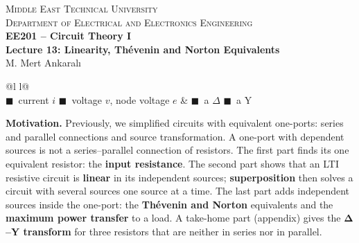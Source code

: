\documentclass[11pt,a4paper]{article}
\newcommand{\Icol}[1]{\textcolor{ccur}{#1}}
\newcommand{\Vcol}[1]{\textcolor{cvolt}{#1}}
\begin{document}
\begin{center}
\begin{tcolorbox}[enhanced, colback=metured!5, colframe=metured, boxrule=1pt,
                  arc=3pt, left=10pt,right=10pt,top=7pt,bottom=7pt, width=\textwidth]
\begin{center}
  {\small\scshape Middle East Technical University}\\[2pt]
  {\small\scshape Department of Electrical and Electronics Engineering}\\[7pt]
  {\Large\bfseries\color{metured} EE201 -- Circuit Theory I}\\[4pt]
  {\large\bfseries Lecture 13: Linearity, Th\'evenin and Norton Equivalents}\\[6pt]
  {\small M. Mert Ankaralı}
\end{center}
\end{tcolorbox}
\end{center}
\vspace{-0.5em}

\begin{center}
\small
\begin{tabular}{@{}l l@{}}
\toprule
{}\\
\midrule
\Icol{$\blacksquare$}~current $i$ \quad
\Vcol{$\blacksquare$}~voltage $v$, node voltage $e$ &
\textcolor{metured}{$\blacksquare$}~a $\Delta$ \quad \Icol{$\blacksquare$}~a Y\\
\bottomrule
\end{tabular}
\end{center}

\textbf{Motivation.} Previously, we simplified circuits with equivalent one-ports: series and
parallel connections and source transformation. A one-port with dependent sources is not a
series--parallel connection of resistors. The first part finds its one equivalent resistor: the
\textbf{input resistance}. The second part shows that an LTI resistive circuit is
\textbf{linear} in its independent sources; \textbf{superposition} then solves a circuit with
several sources one source at a time. The last part adds independent sources inside the
one-port: the \textbf{Th\'evenin and Norton} equivalents and the \textbf{maximum power transfer} to a load. A take-home part (appendix) gives the
\textbf{$\boldsymbol{\Delta}$--Y transform} for three resistors that are neither in series nor
in parallel.
\end{document}
